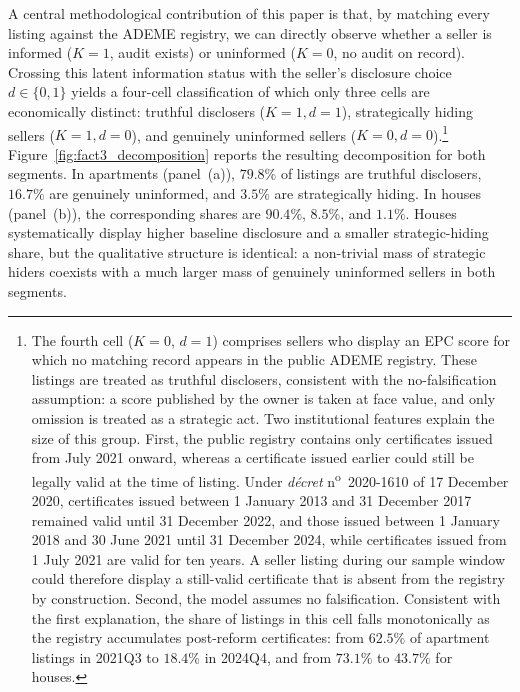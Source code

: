 A central methodological contribution of this paper is that, by matching every listing against the ADEME registry, we can directly observe whether a seller is informed ($K=1$, audit exists) or uninformed ($K=0$, no audit on record). Crossing this latent information status with the seller's disclosure choice $d \in \{0,1\}$ yields a four-cell classification of which only three cells are economically distinct: truthful disclosers ($K=1, d=1$), strategically hiding sellers ($K=1, d=0$), and genuinely uninformed sellers ($K=0, d=0$).\footnote{The fourth cell ($K=0$, $d=1$) comprises sellers who display an EPC score for which no matching record appears in the public ADEME registry. These listings are treated as truthful disclosers, consistent with the no-falsification assumption: a score published by the owner is taken at face value, and only omission is treated as a strategic act. Two institutional features explain the size of this group. First, the public registry contains only certificates issued from July 2021 onward, whereas a certificate issued earlier could still be legally valid at the time of listing. Under \emph{d\'ecret} n\textsuperscript{o}~2020-1610 of 17 December 2020, certificates issued between 1 January 2013 and 31 December 2017 remained valid until 31 December 2022, and those issued between 1 January 2018 and 30 June 2021 until 31 December 2024, while certificates issued from 1 July 2021 are valid for ten years. A seller listing during our sample window could therefore display a still-valid certificate that is absent from the registry by construction. Second, the model assumes no falsification. Consistent with the first explanation, the share of listings in this cell falls monotonically as the registry accumulates post-reform certificates: from $62.5\%$ of apartment listings in 2021Q3 to $18.4\%$ in 2024Q4, and from $73.1\%$ to $43.7\%$ for houses.} Figure~\ref{fig:fact3_decomposition} reports the resulting decomposition for both segments. In apartments (panel~(a)), $79.8\%$ of listings are truthful disclosers, $16.7\%$ are genuinely uninformed, and $3.5\%$ are strategically hiding. In houses (panel~(b)), the corresponding shares are $90.4\%$, $8.5\%$, and $1.1\%$. Houses systematically display higher baseline disclosure and a smaller strategic-hiding share, but the qualitative structure is identical: a non-trivial mass of strategic hiders coexists with a much larger mass of genuinely uninformed sellers in both segments.
